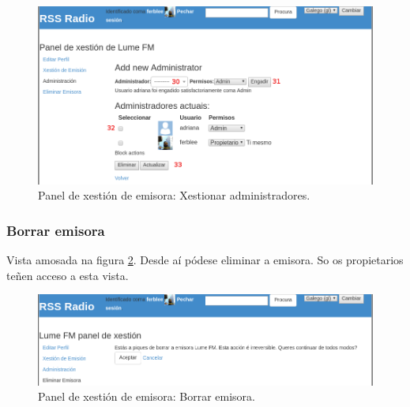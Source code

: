 \begin{figure}[h]
	\centering
	\includegraphics[scale=0.43,keepaspectratio=true]{./images/usermanual/um-edstation3.png}
	\caption{Panel de xestión de emisora: Xestionar administradores.}
	\label{fig:um-edstation3}
\end{figure}


\subsubsection{Borrar emisora}

Vista amosada na figura \ref{fig:um-edstation4}. Desde aí pódese eliminar a emisora. So os propietarios teñen acceso a esta vista.

\begin{figure}[h]
	\centering
	\includegraphics[scale=0.43,keepaspectratio=true]{./images/usermanual/um-edstation4.png}
	\caption{Panel de xestión de emisora: Borrar emisora.}
	\label{fig:um-edstation4}
\end{figure}